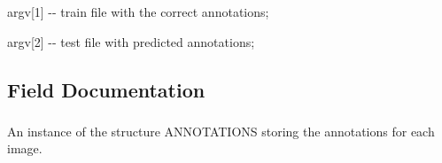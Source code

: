 \begin{DoxyItemize}
\item argv\mbox{[}1\mbox{]} -\/-\/ train file with the correct annotations; \item argv\mbox{[}2\mbox{]} -\/-\/ test file with predicted annotations; \end{DoxyItemize}


\subsection{Field Documentation}
\hypertarget{classannotationsHandle_a42cb5f5737262947250c709931232c69}{
\subsubsection[{image}]{}}
\label{classannotationsHandle_a42cb5f5737262947250c709931232c69}
An instance of the structure {\ttfamily ANNOTATIONS} storing the annotations for each image. 